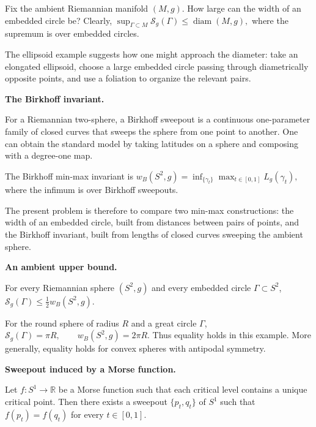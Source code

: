 Fix the ambient Riemannian manifold
$(M,g)$. How large can the width of an
embedded circle be? Clearly,
$
\sup_{\Gamma\subset M}
\mathcal{S}_g(\Gamma)
\leq
\operatorname{diam}(M,g),
$
where the supremum is over embedded
circles.

The ellipsoid example suggests how one
might approach the diameter: take an
elongated ellipsoid, choose a large
embedded circle passing through
diametrically opposite points, and use a
foliation to organize the relevant
pairs.

\medskip\noindent
{\bf The Birkhoff invariant.}

For a Riemannian two-sphere, a Birkhoff
sweepout is a continuous one-parameter
family of closed curves that sweeps the
sphere from one point to another. One
can obtain the standard model by taking
latitudes on a sphere and composing with
a degree-one map.

The Birkhoff min-max invariant is
$
w_B(S^2,g)
=
\inf_{\{\gamma_t\}}
\max_{t\in[0,1]}
L_g(\gamma_t),
$
where the infimum is over Birkhoff
sweepouts.

The present problem is therefore to
compare two min-max constructions:
the width of an embedded circle, built
from distances between pairs of points,
and the Birkhoff invariant, built from
lengths of closed curves sweeping the
ambient sphere.

\medskip\noindent
{\bf An ambient upper bound.}

\begin{theorem}
\label{theorem-amm-ambient-upper-bound}
For every Riemannian sphere $(S^2,g)$
and every embedded circle
$\Gamma\subset S^2$,
$
\mathcal{S}_g(\Gamma)
\leq
\frac{1}{2}w_B(S^2,g).
$
\end{theorem}

\noindent
For the round sphere of radius $R$ and a
great circle $\Gamma$,
$
\mathcal{S}_g(\Gamma)=\pi R,
\qquad
w_B(S^2,g)=2\pi R.
$
Thus equality holds in this example.
More generally, equality holds for convex
spheres with antipodal symmetry.

\medskip\noindent
{\bf Sweepout induced by a Morse function.}

\begin{theorem}
\label{theorem-induced-sweepout-morse}
Let
$
f:S^1\longrightarrow\mathbb{R}
$
be a Morse function such that each critical
level contains a unique critical point.
Then there exists a sweepout
$\{p_t,q_t\}$ of $S^1$ such that
$
f(p_t)=f(q_t)
$
for every $t\in[0,1]$.
\end{theorem}

